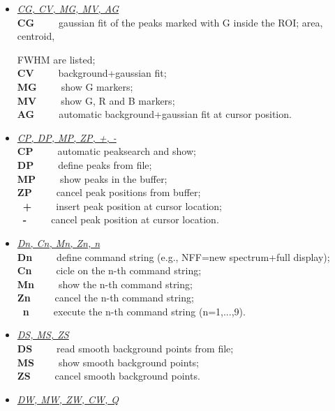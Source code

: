 \begin{itemize}
 \item	{\it\underline{CG, CV, MG, MV, AG}} \\

	{\bf CG}~~~~~gaussian fit of the peaks marked with G inside the ROI; 
	             area, centroid, 
		     
		     \hskip1cm FWHM are listed;\\
	{\bf CV}~~~~~background+gaussian fit;\\
	{\bf MG}~~~~~show G markers;\\
	{\bf MV}~~~~~show G, R and B markers;\\
	{\bf AG}~~~~~automatic background+gaussian fit at cursor position.

 \item	{\it\underline{CP, DP, MP, ZP, +, -}} \\

	{\bf CP}~~~~~automatic peaksearch and show;\\
	{\bf DP}~~~~~define peaks from file;\\
	{\bf MP}~~~~~show peaks in the buffer;\\
	{\bf ZP}~~~~~cancel peak positions from buffer;\\
	{\bf ~+}~~~~~insert peak position at cursor location;\\
	{\bf ~-}~~~~~cancel peak position at cursor location.

 \item	{\it\underline{Dn, Cn, Mn, Zn, n}} \\

	{\bf Dn}~~~~~define command string (e.g., NFF=new spectrum+full display);\\
	{\bf Cn}~~~~~cicle on  the n-th command string;\\
	{\bf Mn}~~~~~show the n-th command string;\\
	{\bf Zn}~~~~~cancel the n-th command string;\\
	{\bf ~n}~~~~~execute the n-th command string (n=1,...,9).

 \item	{\it\underline{DS, MS, ZS}} \\

	{\bf DS}~~~~~read smooth background points from file;\\
	{\bf MS}~~~~~show smooth background points;\\
	{\bf ZS}~~~~~cancel smooth background points.

 \item	{\it\underline{DW, MW, ZW, CW, Q}} \\


\end{itemize}
